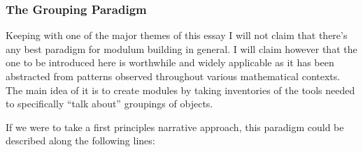 \documentclass[twoside]{article}
\begin{document}
\subsubsection*{The Grouping Paradigm}

Keeping with one of the major themes of this essay I will not claim that there's any best paradigm for modulum building
in general. I will claim however that the one to be introduced here is worthwhile and widely applicable as it has been
abstracted from patterns observed throughout various mathematical contexts. The main idea of it is to create modules
by taking inventories of the tools needed to specifically ``talk about'' groupings of objects.

If we were to take a first principles narrative approach, this paradigm could be described along the following lines:
\end{document}
